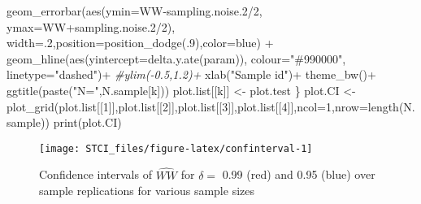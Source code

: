 \documentclass[
]{book}
\newenvironment{Shaded}{\begin{snugshade}}{\end{snugshade}}
\newcommand{\AttributeTok}[1]{\textcolor[rgb]{0.77,0.63,0.00}{#1}}
\newcommand{\CommentTok}[1]{\textcolor[rgb]{0.56,0.35,0.01}{\textit{#1}}}
\newcommand{\DecValTok}[1]{\textcolor[rgb]{0.00,0.00,0.81}{#1}}
\newcommand{\FloatTok}[1]{\textcolor[rgb]{0.00,0.00,0.81}{#1}}
\newcommand{\FunctionTok}[1]{\textcolor[rgb]{0.00,0.00,0.00}{#1}}
\newcommand{\NormalTok}[1]{#1}
\newcommand{\OtherTok}[1]{\textcolor[rgb]{0.56,0.35,0.01}{#1}}
\newcommand{\SpecialCharTok}[1]{\textcolor[rgb]{0.00,0.00,0.00}{#1}}
\newcommand{\StringTok}[1]{\textcolor[rgb]{0.31,0.60,0.02}{#1}}
\theoremstyle{definition}
\theoremstyle{definition}
\theoremstyle{definition}
\theoremstyle{definition}
\theoremstyle{remark}
\begin{document}
\begin{Shaded}
\begin{Highlighting}[]
      \FunctionTok{geom\_errorbar}\NormalTok{(}\FunctionTok{aes}\NormalTok{(}\AttributeTok{ymin=}\NormalTok{WW}\SpecialCharTok{{-}}\NormalTok{sampling.noise}\FloatTok{.2}\SpecialCharTok{/}\DecValTok{2}\NormalTok{, }\AttributeTok{ymax=}\NormalTok{WW}\SpecialCharTok{+}\NormalTok{sampling.noise}\FloatTok{.2}\SpecialCharTok{/}\DecValTok{2}\NormalTok{), }\AttributeTok{width=}\NormalTok{.}\DecValTok{2}\NormalTok{,}\AttributeTok{position=}\FunctionTok{position\_dodge}\NormalTok{(.}\DecValTok{9}\NormalTok{),}\AttributeTok{color=}\StringTok{\textquotesingle{}blue\textquotesingle{}}\NormalTok{) }\SpecialCharTok{+}
      \FunctionTok{geom\_hline}\NormalTok{(}\FunctionTok{aes}\NormalTok{(}\AttributeTok{yintercept=}\FunctionTok{delta.y.ate}\NormalTok{(param)), }\AttributeTok{colour=}\StringTok{"\#990000"}\NormalTok{, }\AttributeTok{linetype=}\StringTok{"dashed"}\NormalTok{)}\SpecialCharTok{+}
      \CommentTok{\#ylim({-}0.5,1.2)+}
      \FunctionTok{xlab}\NormalTok{(}\StringTok{"Sample id"}\NormalTok{)}\SpecialCharTok{+}
      \FunctionTok{theme\_bw}\NormalTok{()}\SpecialCharTok{+}
      \FunctionTok{ggtitle}\NormalTok{(}\FunctionTok{paste}\NormalTok{(}\StringTok{"N="}\NormalTok{,N.sample[k]))}
\NormalTok{  plot.list[[k]] }\OtherTok{\textless{}{-}}\NormalTok{ plot.test }
\NormalTok{\}}
\NormalTok{plot.CI }\OtherTok{\textless{}{-}} \FunctionTok{plot\_grid}\NormalTok{(plot.list[[}\DecValTok{1}\NormalTok{]],plot.list[[}\DecValTok{2}\NormalTok{]],plot.list[[}\DecValTok{3}\NormalTok{]],plot.list[[}\DecValTok{4}\NormalTok{]],}\AttributeTok{ncol=}\DecValTok{1}\NormalTok{,}\AttributeTok{nrow=}\FunctionTok{length}\NormalTok{(N.sample))}
\FunctionTok{print}\NormalTok{(plot.CI)}
\end{Highlighting}
\end{Shaded}

\begin{figure}[htbp]

{\centering \texttt{[image: STCI\_files/figure-latex/confinterval-1]} 

}

\caption{Confidence intervals of $\hat{WW}$ for $\delta=$ 0.99 (red) and 0.95 (blue) over sample replications for various sample sizes}\label{fig:confinterval}
\end{figure}
\end{document}
